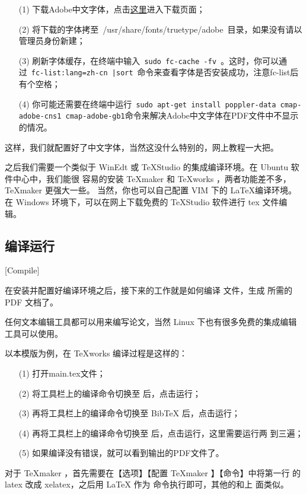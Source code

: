 \begin{enumerate}
\item[(1)] 下载Adobe中文字体，点击\href{http://forum.ubuntu.org.cn/viewtopic.php?f=35&t=180987&start=0}{这里}进入下载页面；
\item[(2)] 将下载的字体拷至~{/usr/share/fonts/truetype/adobe}~目录，如果没有请以管理员身份新建；
\item[(3)] 刷新字体缓存，在终端中输入~\texttt{sudo fc-cache -fv }。这时，你可以通过~\texttt{fc-list:lang=zh-cn |sort}~命令来查看字体是否安装成功，注意fc-list后有个空格；
\item[(4)] 你可能还需要在终端中运行~\texttt{sudo apt-get install poppler-data cmap-adobe-cns1 cmap-adobe-gb1}命令来解决Adobe中文字体在PDF文件中不显示的情况。
\end{enumerate}

这样，我们就配置好了中文字体，当然这没什么特别的，网上教程一大把。

之后我们需要一个类似于 WinEdt 或 TeXStudio 的集成编译环境。在 Ubuntu 软件中心中，我们能很
容易的安装 \TeX{}maker 和 \TeX{}works ，两者功能差不多， \TeX{}maker 更强大一些。
当然，你也可以自己配置 VIM 下的 \LaTeX{}编译环境。在 Windows 环境下，可以在网上下载免费的
TeXStudio 软件进行 tex 文件编辑。

\subsection{编译运行}[Compile]

在安装并配置好编译环境之后，接下来的工作就是如何编译 \XeLaTeX{} 文件，生成
所需的 PDF 文档了。

任何文本编辑工具都可以用来编写论文，当然 Linux 下也有很多免费的集成编辑工具可以使用。

以本模版为例，在 \TeX{}works 编译过程是这样的：
\begin{enumerate}
\item[(1)] 打开main.tex文件；
\item[(2)] 将工具栏上的编译命令切换至 \XeLaTeX{} 后，点击运行；
\item[(3)] 再将工具栏上的编译命令切换至 Bib\TeX{} 后，点击运行；
\item[(4)] 再将工具栏上的编译命令切换至 \XeLaTeX{} 后，点击运行，这里需要运行两
  到三遍；
\item[(5)] 如果编译没有错误，就可以看到输出的PDF文件了。
\end{enumerate}

对于 \TeX{}maker ，首先需要在【选项】【配置 \TeX{}maker 】【命令】中将第一行
的 latex 改成 xelatex，之后用 \LaTeX{} 作为 \XeLaTeX{} 命令执行即可，其他的和上
面类似。

